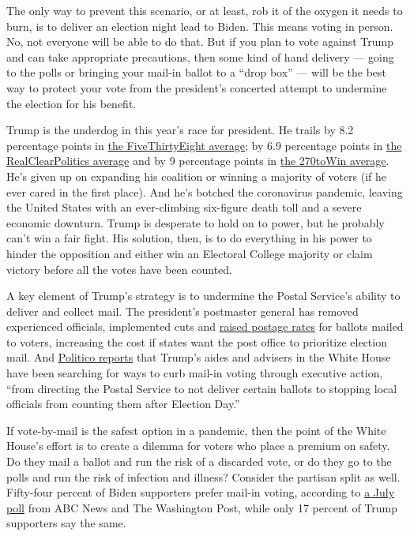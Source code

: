 The only way to prevent this scenario, or at least, rob it of the oxygen
it needs to burn, is to deliver an election night lead to Biden. This
means voting in person. No, not everyone will be able to do that. But if
you plan to vote against Trump and can take appropriate precautions,
then some kind of hand delivery --- going to the polls or bringing your
mail-in ballot to a ``drop box'' --- will be the best way to protect
your vote from the president's concerted attempt to undermine the
election for his benefit.

Trump is the underdog in this year's race for president. He trails by
8.2 percentage points in
\href{https://projects.fivethirtyeight.com/polls/president-general/national/}{the
FiveThirtyEight average}; by 6.9 percentage points in
\href{https://www.realclearpolitics.com/epolls/2020/president/us/general_election_trump_vs_biden-6247.html}{the
RealClearPolitics average} and by 9 percentage points in
\href{https://www.270towin.com/2020-polls-biden-trump/}{the 270toWin
average}. He's given up on expanding his coalition or winning a majority
of voters (if he ever cared in the first place). And he's botched the
coronavirus pandemic, leaving the United States with an ever-climbing
six-figure death toll and a severe economic downturn. Trump is desperate
to hold on to power, but he probably can't win a fair fight. His
solution, then, is to do everything in his power to hinder the
opposition and either win an Electoral College majority or claim victory
before all the votes have been counted.

A key element of Trump's strategy is to undermine the Postal Service's
ability to deliver and collect mail. The president's postmaster general
has removed experienced officials, implemented cuts and
\href{https://twitter.com/marceelias/status/1292877962958823427?s=20}{raised
postage rates} for ballots mailed to voters, increasing the cost if
states want the post office to prioritize election mail. And
\href{https://www.politico.com/news/2020/08/08/trump-wants-to-cut-mail-in-voting-the-republican-machine-is-helping-him-392428}{Politico
reports} that Trump's aides and advisers in the White House have been
searching for ways to curb mail-in voting through executive action,
``from directing the Postal Service to not deliver certain ballots to
stopping local officials from counting them after Election Day.''

If vote-by-mail is the safest option in a pandemic, then the point of
the White House's effort is to create a dilemma for voters who place a
premium on safety. Do they mail a ballot and run the risk of a discarded
vote, or do they go to the polls and run the risk of infection and
illness? Consider the partisan split as well. Fifty-four percent of
Biden supporters prefer mail-in voting, according to
\href{https://www.langerresearch.com/wp-content/uploads/1214a22020Election.pdf}{a
July poll} from ABC News and The Washington Post, while only 17 percent
of Trump supporters say the same.

